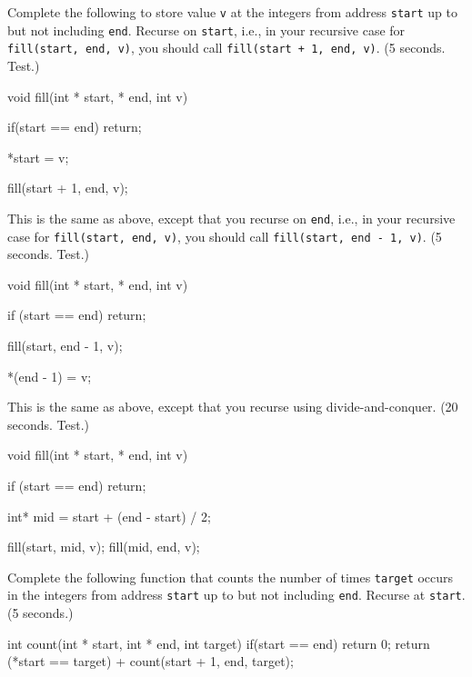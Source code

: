 

\nextq
Complete the following to store value \verb!v! at the integers
from address \verb!start! up to but not including \verb!end!.
Recurse on \verb!start!, i.e., in your recursive case for
\verb!fill(start, end, v)!, you should call
\verb!fill(start + 1, end, v)!.
(5 seconds. Test.)
\\
\ANSWER
\begin{answercode}
void fill(int * start, * end, int v)
{
  if(start == end) return;

  *start = v;
  
  fill(start + 1, end, v);
}
\end{answercode}

\nextq
This is the same as above, except that you recurse on \verb!end!,
i.e., in your recursive case for \verb!fill(start, end, v)!, you should call
\verb!fill(start, end - 1, v)!.
(5 seconds. Test.)
\\
\ANSWER
\begin{answercode}
void fill(int * start, * end, int v)
{
  if (start == end) return; 

  fill(start, end - 1, v);
  
  *(end - 1) = v; 
}
\end{answercode}

\nextq
This is the same as above, except that you recurse using divide-and-conquer.
(20 seconds. Test.)
\\
\ANSWER
\begin{answercode}
void fill(int * start, * end, int v)
{
  if (start == end) return;
  
  int* mid = start + (end - start) / 2;
  
  fill(start, mid, v);
  fill(mid, end, v);

}
\end{answercode}

\nextq
Complete the following function that counts the number of times \verb!target!
occurs in the integers
from address \verb!start! up to but not including \verb!end!.
Recurse at \verb!start!.
(5 seconds.)
\\
\ANSWER
\begin{answercode}
int count(int * start, int * end, int target)
{
  if(start == end) return 0;
  return (*start == target) + count(start + 1, end, target);
}
\end{answercode}

